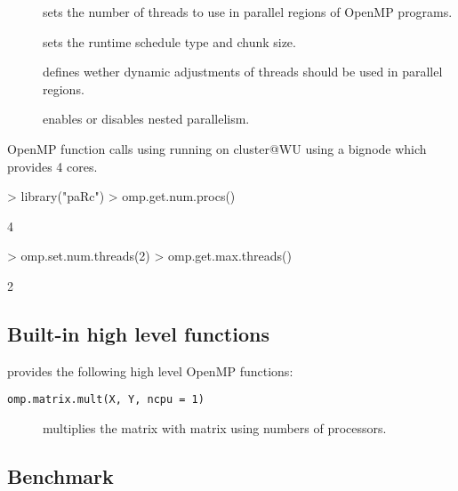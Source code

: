 \begin{description}
\item[] sets the number of threads to use in
  parallel regions of OpenMP programs. 
\item[] sets the runtime schedule type and
  chunk size.
\item[] defines wether dynamic adjustments of threads
  should be used in parallel regions.
\item[] enables or disables nested parallelism.
\end{description}



\begin{Example} OpenMP function calls using  \newline
running on cluster@WU using a bignode which provides 4 cores.

\begin{Schunk}
\begin{Sinput}
> library("paRc")
> omp.get.num.procs()
\end{Sinput}
\begin{Soutput}
[1] 4
\end{Soutput}
\begin{Sinput}
> omp.set.num.threads(2)
> omp.get.max.threads()
\end{Sinput}
\begin{Soutput}
[1] 2
\end{Soutput}
\end{Schunk}
\label{ex:paRcOMP}
\end{Example}


\subsection{Built-in high level functions}

 provides the following high level OpenMP functions: 

\begin{description}
\item[\texttt{omp.matrix.mult(X, Y, ncpu = 1)}] multiplies the matrix
   with matrix  using  numbers of
  processors.
\end{description}


\subsection{Benchmark}

